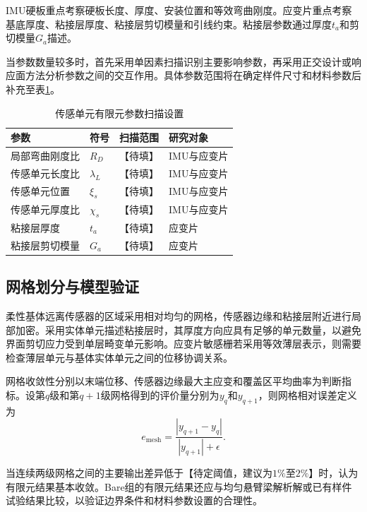 IMU硬板重点考察硬板长度、厚度、安装位置和等效弯曲刚度。应变片重点考察基底厚度、粘接层厚度、粘接层剪切模量和引线约束。粘接层参数通过厚度$t_a$和剪切模量$G_a$描述。

当参数数量较多时，首先采用单因素扫描识别主要影响参数，再采用正交设计或响应面方法分析参数之间的交互作用。具体参数范围将在确定样件尺寸和材料参数后补充至表\ref{tab:parametric_sweep}。

\begin{table}[!htbp]
    \centering
    \caption{传感单元有限元参数扫描设置}
    \label{tab:parametric_sweep}
    \begin{tabular}{llll}
        \toprule
        参数 & 符号 & 扫描范围 & 研究对象 \\
        \midrule
        局部弯曲刚度比 & $R_D$ & 【待填】 & IMU与应变片 \\
        传感单元长度比 & $\lambda_L$ & 【待填】 & IMU与应变片 \\
        传感单元位置 & $\xi_s$ & 【待填】 & IMU与应变片 \\
        传感单元厚度比 & $\chi_s$ & 【待填】 & IMU与应变片 \\
        粘接层厚度 & $t_a$ & 【待填】 & 应变片 \\
        粘接层剪切模量 & $G_a$ & 【待填】 & 应变片 \\
        \bottomrule
    \end{tabular}
\end{table}


\subsection{网格划分与模型验证}

柔性基体远离传感器的区域采用相对均匀的网格，传感器边缘和粘接层附近进行局部加密。采用实体单元描述粘接层时，其厚度方向应具有足够的单元数量，以避免界面剪切应力受到单层畸变单元影响。应变片敏感栅若采用等效薄层表示，则需要检查薄层单元与基体实体单元之间的位移协调关系。

网格收敛性分别以末端位移、传感器边缘最大主应变和覆盖区平均曲率为判断指标。设第$q$级和第$q+1$级网格得到的评价量分别为$y_q$和$y_{q+1}$，则网格相对误差定义为
\begin{equation}
    e_{\mathrm{mesh}}
    =
    \frac{
    \left|y_{q+1}-y_q\right|
    }{
    \left|y_{q+1}\right|+\epsilon
    }.
    \label{eq:mesh_convergence_error}
\end{equation}

当连续两级网格之间的主要输出差异低于【待定阈值，建议为$1\%$至$2\%$】时，认为有限元结果基本收敛。Bare组的有限元结果还应与均匀悬臂梁解析解或已有样件试验结果比较，以验证边界条件和材料参数设置的合理性。

